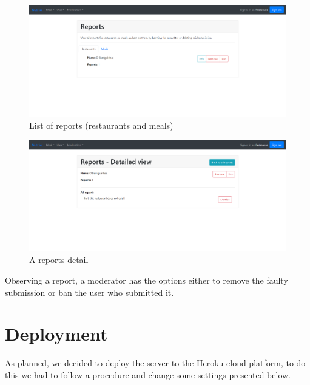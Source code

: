 \begin{figure}[H]
    \begin{center}
        \includegraphics[scale=0.1, width=\textwidth]{_figures/reports.png}
        \caption{List of reports (restaurants and meals)} 
    \end{center}
\end{figure}

\begin{figure}[H]
    \begin{center}
        \includegraphics[scale=0.1, width=\textwidth]{_figures/detailed-report.png}
        \caption{A reports detail} 
    \end{center}
\end{figure}

Observing a report, a moderator has the options either to remove the faulty submission or ban
the user who submitted it.\\

\section{Deployment}

As planned, we decided to deploy the server to the Heroku\cite{heroku} cloud platform, to do this we had to follow a procedure and change some settings presented below.\\

